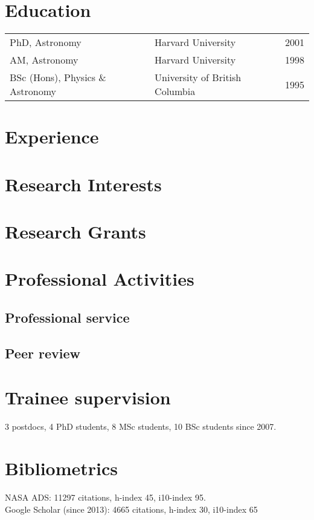 \documentclass[12pt]{article}
\begin{document}
\maketitle

\section{Education}
\begin{tabularx}{\textwidth}{lXr}
PhD, Astronomy & Harvard University & 2001\\
AM, Astronomy & Harvard University & 1998\\
BSc (Hons),  Physics \& Astronomy & University of British Columbia&1995\\
\end{tabularx}

\section{Experience} 


\section{Research Interests}


\section{Research Grants}


\section{Professional Activities}


\subsection{Professional service}


\subsection{Peer review}


\section{Trainee supervision}
3 postdocs, 4 PhD students, 8 MSc students, 10 BSc students since 2007.

\section{Bibliometrics}
NASA ADS: 11297 citations, h-index 45, i10-index 95.\\
Google Scholar (since 2013): 4665 citations, h-index 30, i10-index 65
\end{document}
